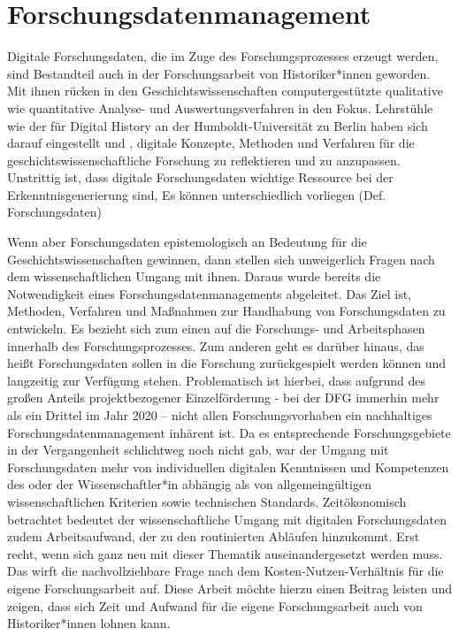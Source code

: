 \section{Forschungsdatenmanagement}

Digitale Forschungsdaten, die im Zuge des Forschungsprozesses erzeugt werden, sind Bestandteil auch in der Forschungsarbeit von Historiker*innen geworden. Mit ihnen rücken in den Geschichtswissenschaften computergestützte qualitative wie quantitative Analyse- und Auswertungsverfahren in den Fokus. Lehrstühle wie der für Digital History an der Humboldt-Universität zu Berlin haben sich darauf eingestellt und , digitale Konzepte, Methoden und Verfahren für die geschichtswissenschaftliche Forschung zu reflektieren und zu anzupassen.  Unstrittig ist, dass digitale Forschungsdaten wichtige Ressource bei der Erkenntnisgenerierung sind, Es können unterschiedlich vorliegen (Def. Forschungsdaten)

Wenn aber Forschungsdaten epistemologisch an Bedeutung für die Geschichtswissenschaften gewinnen, dann stellen sich unweigerlich Fragen nach dem wissenschaftlichen Umgang mit ihnen. Daraus wurde bereits die Notwendigkeit eines Forschungsdatenmanagements abgeleitet.  Das Ziel ist, Methoden, Verfahren und Maßnahmen zur Handhabung von Forschungsdaten zu entwickeln. Es bezieht sich zum einen auf die Forschungs- und Arbeitsphasen innerhalb des Forschungsprozesses. Zum anderen geht es darüber hinaus, das heißt Forschungsdaten sollen in die Forschung zurückgespielt werden können und langzeitig zur Verfügung stehen. Problematisch ist hierbei, dass aufgrund des großen Anteils projektbezogener Einzelförderung - bei der DFG immerhin mehr als ein Drittel im Jahr 2020  – nicht allen Forschungsvorhaben ein nachhaltiges Forschungsdatenmanagement inhärent ist. Da es entsprechende Forschungsgebiete in der Vergangenheit schlichtweg noch nicht gab, war der Umgang mit Forschungsdaten mehr von individuellen digitalen Kenntnissen und Kompetenzen des oder der Wissenschaftler*in abhängig als von allgemeingültigen wissenschaftlichen Kriterien sowie technischen Standards. Zeitökonomisch betrachtet bedeutet der wissenschaftliche Umgang mit digitalen Forschungsdaten zudem Arbeitsaufwand, der zu den routinierten Abläufen hinzukommt. Erst recht, wenn sich ganz neu mit dieser Thematik auseinandergesetzt werden muss. Das wirft die nachvollziehbare Frage nach dem Kosten-Nutzen-Verhältnis für die eigene Forschungsarbeit auf. Diese Arbeit möchte hierzu einen Beitrag leisten und zeigen, dass sich Zeit und Aufwand für die eigene Forschungsarbeit auch von Historiker*innen lohnen kann.

